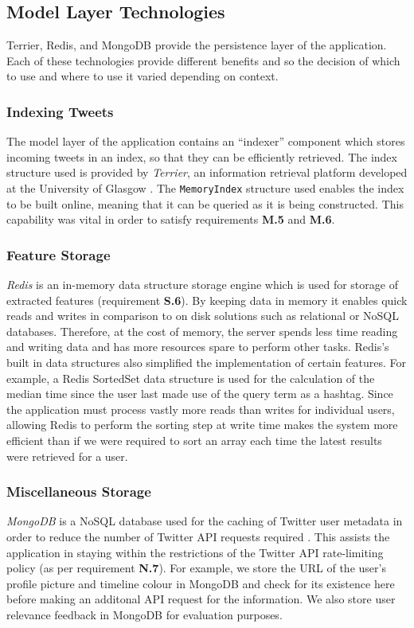 \documentclass{l4proj}
\newcommand{\code}[1]{\texttt{#1}}
\begin{document}
    \subsection{Model Layer Technologies}
    Terrier, Redis, and MongoDB provide the persistence layer of the application. Each of these technologies provide different benefits and so the decision of which to use and where to use it varied depending on context.
    
        \subsubsection{Indexing Tweets}
        The model layer of the application contains an ``indexer'' component which stores incoming tweets in an index, so that they can be efficiently retrieved. The index structure used is provided by \textit{Terrier}, an information retrieval platform developed at the University of Glasgow \cite{macdonald2012puppy}. The \code{MemoryIndex} structure used enables the index to be built online, meaning that it can be queried as it is being constructed. This capability was vital in order to satisfy requirements \textbf{M.5} and \textbf{M.6}.
        
        \subsubsection{Feature Storage}
        \textit{Redis} is an in-memory data structure storage engine which is used for storage of extracted features (requirement \textbf{S.6})\cite{redis}. By keeping data in memory it enables quick reads and writes in comparison to on disk solutions such as relational or NoSQL databases. Therefore, at the cost of memory, the server spends less time reading and writing data and has more resources spare to perform other tasks. Redis's built in data structures also simplified the implementation of certain features. For example, a Redis SortedSet data structure is used for the calculation of the median time since the user last made use of the query term as a hashtag. Since the application must process vastly more reads than writes for individual users, allowing Redis to perform the sorting step at write time makes the system more efficient than if we were required to sort an array each time the latest results were retrieved for a user.
        
         \subsubsection{Miscellaneous Storage}
         \textit{MongoDB} is a NoSQL database used for the caching of Twitter user metadata in order to reduce the number of Twitter API requests required \cite{mongo}. This assists the application in staying within the restrictions of the Twitter API rate-limiting policy (as per requirement \textbf{N.7}). For example, we store the URL of the user's profile picture and timeline colour in MongoDB and check for its existence here before making an additonal API request for the information. We also store user relevance feedback in MongoDB for evaluation purposes.
         
\end{document}
